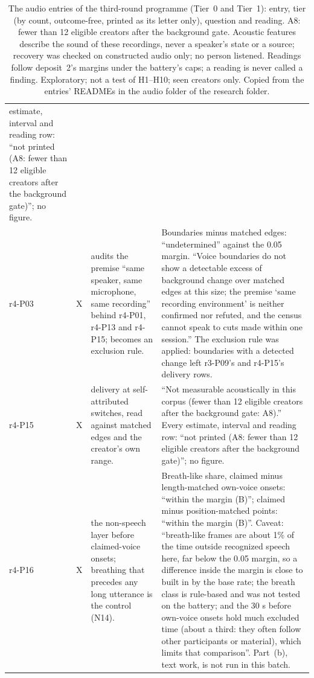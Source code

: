 \begin{table}[tp]
\begin{tabular}{@{}>{\raggedright\arraybackslash}p{}>{\raggedright\arraybackslash}p{}>{\raggedright\arraybackslash}p{}p{}@{}}
estimate, interval and reading row: ``not printed (A8: fewer than 12 eligible creators after the background gate)''; no
figure. \\
r4-P03 & X & audits the premise ``same speaker, same microphone, same recording'' behind r4-P01, r4-P13 and r4-P15;
becomes an exclusion rule. & Boundaries minus matched edges: ``undetermined'' against the 0.05 margin. ``Voice
boundaries do not show a detectable excess of background change over matched edges at this size; the premise `same
recording environment' is neither confirmed nor refuted, and the census cannot speak to cuts made within one session.''
The exclusion rule was applied: boundaries with a detected change left r3-P09's and r4-P15's delivery rows. \\
r4-P15 & X & delivery at self-attributed switches, read against matched edges and the creator's own range. & ``Not
measurable acoustically in this corpus (fewer than 12 eligible creators after the background gate: A8).'' Every
estimate, interval and reading row: ``not printed (A8: fewer than 12 eligible creators after the background gate)''; no
figure. \\
r4-P16 & X & the non-speech layer before claimed-voice onsets; breathing that precedes any long utterance is the
control (N14). & Breath-like share, claimed minus length-matched own-voice onsets: ``within the margin (B)''; claimed
minus position-matched points: ``within the margin (B)''. Caveat: ``breath-like frames are about 1\% of the time outside
recognized speech here, far below the 0.05 margin, so a difference inside the margin is close to built in by the base
rate; the breath class is rule-based and was not tested on the battery; and the 30 s before own-voice onsets hold much
excluded time (about a third: they often follow other participants or material), which limits that comparison''.
Part~(b), text work, is not run in this batch. \\
\bottomrule
\end{tabular}
\caption{The audio entries of the third-round programme (Tier~0 and Tier~1): entry, tier (by count, outcome-free,
printed as its letter only), question and reading. A8: fewer than 12 eligible creators after the background gate.
Acoustic features describe the sound of these recordings, never a speaker's state or a source; recovery was checked on
constructed audio only; no person listened. Readings follow deposit~2's margins under the battery's caps; a reading is
never called a finding. Exploratory; not a test of H1--H10; seen creators only. Copied from the entries' READMEs in the
audio folder of the research folder. \LabelValidity}
\label{tab:panel3-audio}
\end{table}

